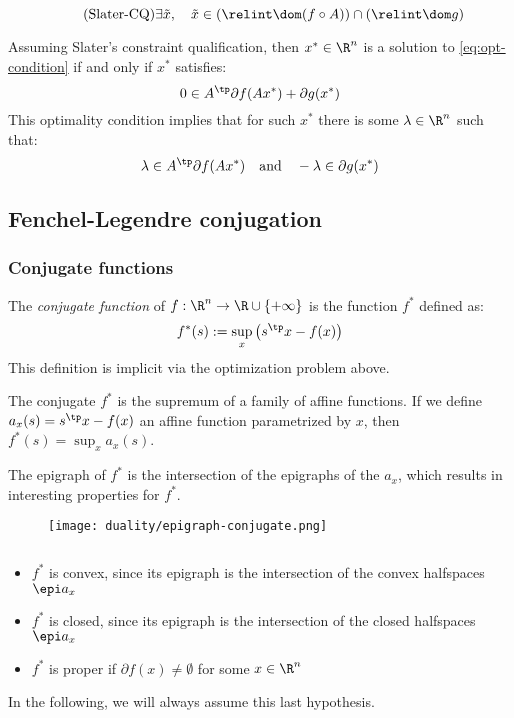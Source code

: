 \begin{theorem}
    \begin{equation}
        \tag{Slater-CQ}
        \exists \tilde{x}, \quad \tilde{x}\in(\relint\dom (f\circ A)) \cap(\relint\dom g)
    \end{equation}
\end{theorem}

Assuming Slater's constraint qualification, then $x^*\in\R^n$ is a solution to \autoref{eq:opt-condition} if and only if $x^*$ satisfies:
\begin{equation*}
    0\in A^\tp\partial f(Ax^*) + \partial g(x^*)
\end{equation*}
This optimality condition implies that for such $x^*$ there is some $\lambda\in\R^n$ such that:
\begin{equation*}
    \lambda\in A^\tp\partial f(Ax^*) \quad\text{and}\quad -\lambda\in\partial g(x^*)
\end{equation*}

\subsection{Fenchel-Legendre conjugation}
\subsubsection{Conjugate functions}
\begin{definition}
    The \emph{conjugate function} of $f:\R^n\to\R\cup\{+\infty\}$ is the function $f^*$ defined as:
    \begin{equation}
        \label{eq:conjugate}
        f^*(s):=\sup_x\left(s^\tp x-f(x)\right)
    \end{equation}
    This definition is implicit via the optimization problem above.
\end{definition}

The conjugate $f^*$ is the supremum of a family of affine functions. If we define $a_x(s)=s^\tp x-f(x)$ an affine function parametrized by $x$, then $f^*(s)=\sup_x a_x(s)$. 

The epigraph of $f^*$ is the intersection of the epigraphs of the $a_x$, which results in interesting properties for $f^*$.
\begin{figure}[H]
    \centering
    \texttt{[image: duality/epigraph-conjugate.png]}
\end{figure}
\begin{property}$ $
    \begin{itemize}
        \item $f^*$ is convex, since its epigraph is the intersection of the convex halfspaces $\epi a_x$
        \item $f^*$ is closed, since its epigraph is the intersection of the closed halfspaces $\epi a_x$
        \item $f^*$ is proper if $\partial f(x)\neq\emptyset$ for some $x\in\R^n$
    \end{itemize}
    In the following, we will always assume this last hypothesis.
\end{property}

